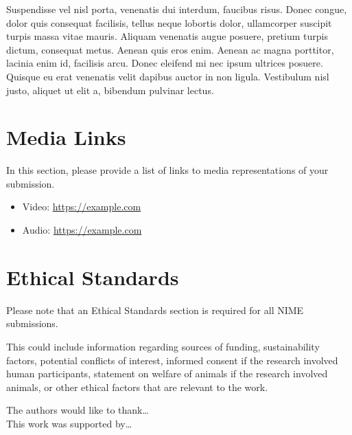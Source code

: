 \documentclass[acmsmall]{nimeart}
\begin{document}
Suspendisse vel nisl porta, venenatis dui interdum, faucibus risus. Donec congue, dolor quis consequat facilisis, tellus neque lobortis dolor, ullamcorper suscipit turpis massa vitae mauris. Aliquam venenatis augue posuere, pretium turpis dictum, consequat metus. Aenean quis eros enim. Aenean ac magna porttitor, lacinia enim id, facilisis arcu. Donec eleifend mi nec ipsum ultrices posuere. Quisque eu erat venenatis velit dapibus auctor in non ligula. Vestibulum nisl justo, aliquet ut elit a, bibendum pulvinar lectus.

\section{Media Links}

In this section, please provide a list of links to media representations of your submission.

\begin{itemize}
	\item Video: \url{https://example.com}
	\item Audio: \url{https://example.com}
\end{itemize}

\section{Ethical Standards}

Please note that an Ethical Standards section is required for all NIME submissions.

This could include information regarding sources of funding, sustainability factors, potential conflicts of interest,  informed consent if the research involved human participants, statement on welfare of animals if the research involved animals, or other ethical factors that are relevant to the work.

\begin{acks}
The authors would like to thank\ldots
\\
This work was supported by\ldots
\end{acks}



\end{document}

